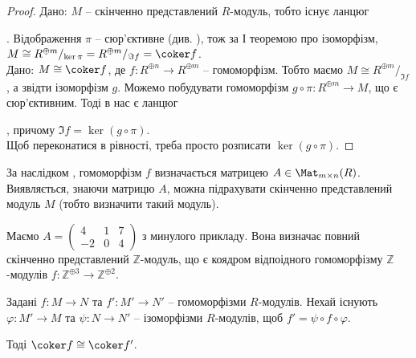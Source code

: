 \documentclass{math_library}
\begin{document}
\begin{proof}
\rightproof Дано: $M$ -- скінченно представлений $R$-модуль, тобто існує ланцюг .
Відображення $\pi$ -- сюр'єктивне (див. ), тож за І теоремою про ізоморфізм, \\
$M \cong R^{\oplus m}/_{\ker \pi} = R^{\oplus m}/_{\Im f} = \coker f$.
\bigskip \\
\leftproof Дано: $M \cong \coker f$, де $f \colon R^{\oplus n} \to R^{\oplus m}$ -- гомоморфізм. Тобто маємо $M \cong R^{\oplus m}/_{\Im f}$, а звідти ізоморфізм $g$. Можемо побудувати гомоморфізм $g \circ \pi \colon R^{\oplus m} \to M$, що є сюр'єктивним. Тоді в нас є ланцюг , причому $\Im f = \ker (g \circ \pi)$.\\
Щоб переконатися в рівності, треба просто розписати $\ker (g \circ \pi)$.
\end{proof}

\begin{remark}
За наслідком , гомоморфізм $f$ визначається матрицею $A \in \Mat_{m \times n}(R)$. Виявляється, знаючи матрицю $A$, можна підрахувати скінченно представлений модуль $M$ (тобто визначити такий модуль).
\end{remark}

\begin{example}
Маємо $A = \begin{pmatrix}
4 & 1 & 7 \\
-2 & 0 & 4
\end{pmatrix}$ з минулого прикладу. Вона визначає повний скінченно представлений $\mathbb{Z}$-модуль, що є коядром відпоідного гомоморфізму $\mathbb{Z}$-модулів $f \colon \mathbb{Z}^{\oplus 3} \to \mathbb{Z}^{\oplus 2}$.
\end{example}

\begin{proposition}
Задані $f \colon M \to N$ та $f' \colon M' \to N'$ -- гомоморфізми $R$-модулів. Нехай існують $\varphi \colon M' \to M$ та $\psi \colon N \to N'$ -- ізоморфізми $R$-модулів, щоб $f' = \psi \circ f \circ \varphi$.
\begin{figure}[H]
\centering
{}
\end{figure}
Тоді $\coker f \cong \coker f'$.
\end{proposition}
\end{document}
